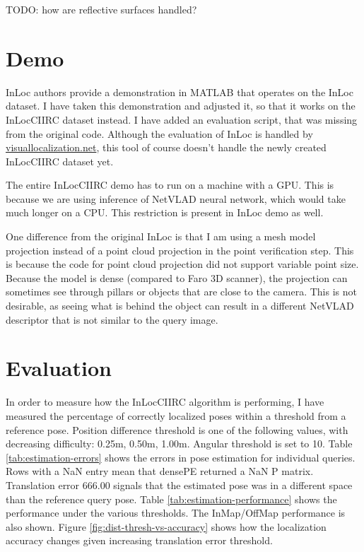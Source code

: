 \documentclass[twoside]{ctuthesis}
\theoremstyle{plain}
\theoremstyle{definition}
\theoremstyle{note}
\begin{document}
TODO: how are reflective surfaces handled?

\chapter{Demo}

InLoc \cite{taira2018inloc} authors provide a demonstration in MATLAB that operates on the InLoc dataset. I have taken this demonstration and adjusted it, so that it works on the InLocCIIRC dataset instead. I have added an evaluation script, that was missing from the original code. Although the evaluation of InLoc is handled by \url{visuallocalization.net}, this tool of course doesn't handle the newly created InLocCIIRC dataset yet.

The entire InLocCIIRC demo has to run on a machine with a GPU. This is because we are using inference of NetVLAD neural network, which would take much longer on a CPU. This restriction is present in InLoc demo as well.

One difference from the original InLoc is that I am using a mesh model projection instead of a point cloud projection in the point verification step. This is because the code for point cloud projection did not support variable point size. Because the model is dense (compared to Faro 3D scanner), the projection can sometimes see through pillars or objects that are close to the camera. This is not desirable, as seeing what is behind the object can result in a different NetVLAD descriptor that is not similar to the query image.

\chapter{Evaluation}

In order to measure how the InLocCIIRC algorithm is performing, I have measured the percentage of correctly localized poses within a threshold from a reference pose. Position difference threshold is one of the following values, with decreasing difficulty: 0.25m, 0.50m, 1.00m. Angular threshold is set to 10\degree. Table \ref{tab:estimation-errors} shows the errors in pose estimation for individual queries. Rows with a NaN entry mean that densePE returned a NaN P matrix. Translation error $666.00$ signals that the estimated pose was in a different space than the reference query pose. Table \ref{tab:estimation-performance} shows the performance under the various thresholds. The InMap/OffMap performance is also shown. Figure \ref{fig:dist-thresh-vs-accuracy} shows how the localization accuracy changes given increasing translation error threshold.
\end{document}

